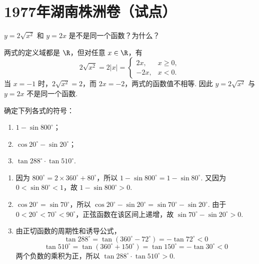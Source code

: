 \chapter{1977年湖南株洲卷（试点）}

\begin{problem}
\(y=2\sqrt{x^2}\) 和 \(y=2x\) 是不是同一个函数？为什么？
\end{problem}

\begin{solution}
两式的定义域都是 \(\R\)，但对任意 \(x\in\R\)，有
\[
2\sqrt{x^2}=2\lvert x\rvert=\begin{cases}
2x, & x\geq 0,\\
-2x, & x<0.
\end{cases}
\]
当 \(x=-1\) 时，\(2\sqrt{x^2}=2\)，而 \(2x=-2\)，两式的函数值不相等. 因此 \(y=2\sqrt{x^2}\) 与 \(y=2x\) 不是同一个函数.
\end{solution}

\begin{problem}
确定下列各式的符号：

\begin{enumerate}
\item \(1-\sin 800^\circ\)；
\item \(\cos 20^\circ-\sin 20^\circ\)；
\item \(\tan 288^\circ\cdot\tan 510^\circ\).
\end{enumerate}
\end{problem}

\begin{solution}
\begin{enumerate}
\item 因为 \(800^\circ=2\times 360^\circ+80^\circ\)，所以
\(1-\sin 800^\circ=1-\sin 80^\circ\). 又因为 \(0<\sin 80^\circ<1\)，故 \(1-\sin 800^\circ>0\).

\item \(\cos 20^\circ=\sin 70^\circ\)，所以
\(\cos 20^\circ-\sin 20^\circ=\sin 70^\circ-\sin 20^\circ\). 由于 \(0<20^\circ<70^\circ<90^\circ\)，正弦函数在该区间上递增，故 \(\sin 70^\circ-\sin 20^\circ>0\).

\item 由正切函数的周期性和诱导公式，
\[
\tan 288^\circ=\tan\left(360^\circ-72^\circ\right)=-\tan 72^\circ<0
\]
\[
\tan 510^\circ=\tan\left(360^\circ+150^\circ\right)=\tan 150^\circ=-\tan 30^\circ<0
\]
两个负数的乘积为正，所以 \(\tan 288^\circ\cdot\tan 510^\circ>0\).
\end{enumerate}
\end{solution}

